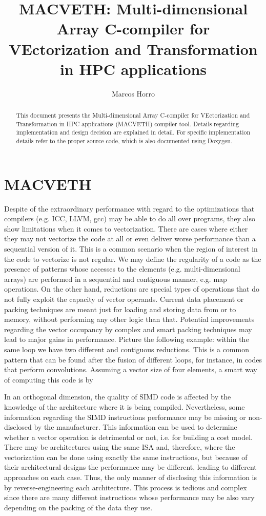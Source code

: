 \documentclass[a4paper,12pt]{memoir}
\title{\textbf{MACVETH}: \textbf{M}ulti-dimensional \textbf{A}rray
    \textbf{C}-compiler for \textbf{VE}ctorization and
    \textbf{T}ransformation in \textbf{H}PC applications}
\author{Marcos Horro}
\date{}
\begin{document}
\maketitle

\begin{abstract}
This document presents the Multi-dimensional Array C-compiler for VEctorization 
and Transformation in HPC applications (MACVETH) compiler tool. Details 
regarding implementation and design decision are explained in detail. For 
specific implementation details refer to the proper source code, which is also 
documented using Doxygen.
\end{abstract}

\chapter{MACVETH}

Despite of the extraordinary performance with regard to the optimizations that compilers (e.g. ICC, LLVM, gcc) may be able to do all over programs, they also show limitations when it comes to vectorization. There are cases where either they may not vectorize the code at all or even deliver worse performance than a sequential version of it. This is a common scenario when the region of interest in the code to vectorize is not regular. We may define the regularity of a code as the presence of patterns whose accesses to the elements (e.g. multi-dimensional arrays) are performed in a sequential and contiguous manner, e.g. map operations. On the other hand, reductions are special types of operations that do not fully exploit the capacity of vector operands. Current data placement or packing techniques are meant just for loading and storing data from or to memory, without performing any other logic than that. Potential improvements regarding the vector occupancy by complex and smart packing techniques may lead to major gains in performance. Picture the following example: within the same loop we have two different and contiguous reductions. This is a common pattern that can be found after the fusion of different loops, for instance, in codes that perform convolutions. Assuming a vector size of four elements, a smart way of computing this code is by 

In an orthogonal dimension, the quality of SIMD code is affected by the knowledge of the architecture where it is being compiled. Nevertheless, some information regarding the SIMD instructions performance may be missing or non-disclosed by the manufacturer. This information can be used to determine whether a vector operation is detrimental or not, i.e. for building a cost model. There may be architectures using the same ISA and, therefore, where the vectorization can be done using exactly the same instructions, but because of their architectural designs the performance may be different, leading to different approaches on each case. Thus, the only manner of disclosing this information is by reverse-engineering each architecture. This process is tedious and complex since there are many different instructions whose performance may be also vary depending on the packing of the data they use.
\end{document}
